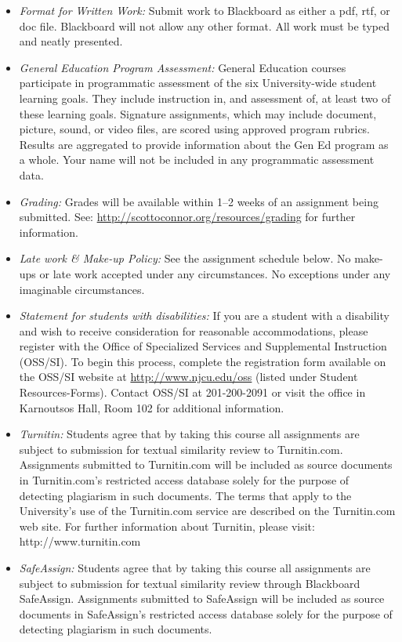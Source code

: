 \documentclass[article,oneside]{memoir}
\begin{document}
\begin{itemize}
\item \textit{Format for Written Work:} Submit work to Blackboard as either a pdf, rtf, or doc file. Blackboard will not allow any other format. All work must be typed and neatly presented. 


\item \textit{General Education Program Assessment:} General Education courses participate in programmatic assessment of the six University-wide student learning goals. They include instruction in, and assessment of, at least two of these learning goals. Signature assignments, which may include document, picture, sound, or video files, are scored using approved program rubrics. Results are aggregated to provide information about the Gen Ed program as a whole. Your name will not be included in any programmatic assessment data.

\item \textit{Grading:} Grades will be available within 1--2 weeks of an assignment being submitted. See: \href{http://scottoconnor.org/resources/grading}{http://scottoconnor.org/resources/grading} for further information.


\item \textit{Late work \& Make-up Policy:} See the assignment schedule below. No make-ups or late work accepted under any circumstances. No exceptions under any imaginable circumstances.

\item \textit{Statement for students with disabilities:} If you are a student
with a disability and wish to receive consideration for reasonable
accommodations, please register with the Office of Specialized Services
and Supplemental Instruction (OSS/SI). To begin this process, complete
the registration form available on the OSS/SI website at
\href{http://www.njcu.edu/oss}{http://www.njcu.edu/oss}
(listed under Student Resources-Forms). Contact OSS/SI at 201-200-2091
or visit the office in Karnoutsos Hall, Room 102 for additional
information.

\item \textit{Turnitin:} Students agree that by taking this course all assignments are subject to submission for textual similarity review to Turnitin.com. Assignments submitted to Turnitin.com will be included as source documents in Turnitin.com's restricted access database solely for the purpose of detecting plagiarism in such documents.  The terms that apply to the University’s use of the Turnitin.com service are described on the Turnitin.com web site.  For further information about Turnitin, please visit: http://www.turnitin.com 

\item \textit{SafeAssign:} Students agree that by taking this course all assignments are subject to submission for textual similarity review through Blackboard SafeAssign. Assignments submitted to SafeAssign will be included as source documents in SafeAssign's restricted access database solely for the purpose of detecting plagiarism in such documents.  


\end{itemize}
\end{document}
